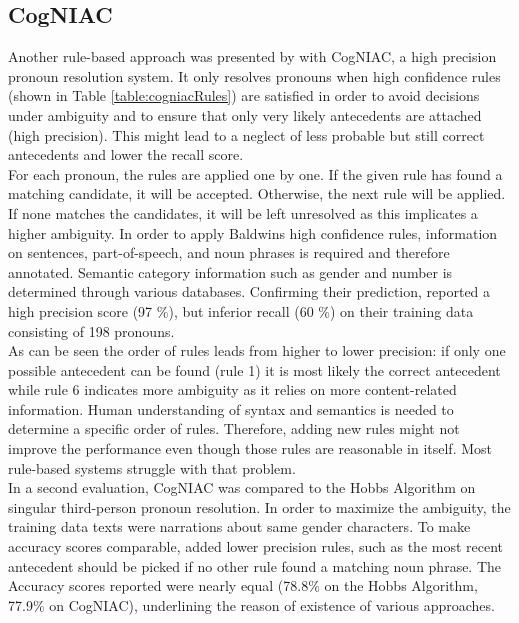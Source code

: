 \subsection{CogNIAC}
Another rule-based approach was presented by \citep{baldwin1997cogniac} with CogNIAC, a high precision pronoun resolution system. It only resolves pronouns when high confidence rules (shown in Table \ref{table:cogniacRules}) are satisfied in order to avoid decisions under ambiguity and to ensure that only very likely antecedents are attached (high precision). This might lead to a neglect of less probable but still correct antecedents and lower the recall score. 
\\
For each pronoun, the rules are applied one by one. If the given rule has found a matching candidate, it will be accepted. Otherwise, the next rule will be applied. If none matches the candidates, it will be left unresolved as this implicates a higher ambiguity. In order to apply Baldwins high confidence rules, information on sentences, part-of-speech, and noun phrases is required and therefore annotated. Semantic category information such as gender and number is determined through various databases. Confirming their prediction, \citep{baldwin1997cogniac} reported a high precision score (97 \%), but inferior recall (60 \%) on their training data consisting of 198 pronouns.\\
As can be seen the order of rules leads from higher to lower precision: if only one possible antecedent can be found (rule 1) it is most likely the correct antecedent while rule 6 indicates more ambiguity as it relies on more content-related information. Human understanding of syntax and semantics is needed to determine a specific order of rules. Therefore, adding new rules might not improve the performance even though those rules are reasonable in itself. Most rule-based systems struggle with that problem.\\
In a second evaluation, CogNIAC was compared to the Hobbs Algorithm \citep{baldwin1997cogniac,hobbs1978resolving} on singular third-person pronoun resolution. In order to maximize the ambiguity, the training data texts were narrations about same gender characters. To make accuracy scores comparable, \cite{baldwin1997cogniac} added lower precision rules, such as the most recent antecedent should be picked if no other rule found a matching noun phrase. The Accuracy scores reported were nearly equal (78.8\% on the Hobbs Algorithm, 77.9\% on CogNIAC), underlining the reason of existence of various approaches.

